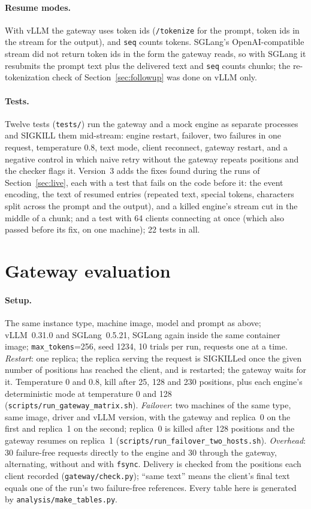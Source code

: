 \documentclass[10pt,twocolumn]{article}
\begin{document}
\paragraph{Resume modes.} With vLLM the gateway uses token ids
(\texttt{/tokenize} for the prompt, token ids in the stream for the output),
and \texttt{seq} counts tokens. SGLang's OpenAI-compatible stream did not
return token ids in the form the gateway reads, so with SGLang it resubmits
the prompt text plus the delivered text and \texttt{seq} counts chunks; the
re-tokenization check of Section~\ref{sec:followup} was done on vLLM only.

\paragraph{Tests.} Twelve tests (\texttt{tests/}) run the gateway and a mock
engine as separate processes and SIGKILL them mid-stream: engine restart,
failover, two failures in one request, temperature 0.8, text mode, client
reconnect, gateway restart, and a negative control in which naive retry
without the gateway repeats positions and the checker flags it. Version~3
adds the fixes found during the runs of Section~\ref{sec:live}, each with a
test that fails on the code before it: the event encoding, the text of
resumed entries (repeated text, special tokens, characters split across the
prompt and the output), and a killed engine's stream cut in the middle of a
chunk; and a test with 64 clients connecting at once (which also passed
before its fix, on one machine); 22 tests in all.

\section{Gateway evaluation}
\label{sec:gweval}

\paragraph{Setup.} The same instance type, machine image, model and prompt as
above; vLLM~0.31.0 and SGLang~0.5.21, SGLang again inside the same container
image; \texttt{max\_tokens}=256, seed 1234, 10 trials per run, requests one at
a time. \emph{Restart}: one replica; the replica serving the request is
SIGKILLed once the given number of positions has reached the client, and is
restarted; the gateway waits for it. Temperature 0 and 0.8, kill after 25,
128 and 230 positions, plus each engine's deterministic mode at temperature
0 and 128 (\texttt{scripts/run\_gateway\_matrix.sh}). \emph{Failover}: two
machines of the same type, same image, driver and vLLM version, with the
gateway and replica~0 on the first and replica~1 on the second; replica~0 is
killed after 128 positions and the gateway resumes on replica~1
(\texttt{scripts/run\_failover\_two\_hosts.sh}). \emph{Overhead}: 30
failure-free requests directly to the engine and 30 through the gateway,
alternating, without and with \texttt{fsync}. Delivery is checked from the
positions each client recorded (\texttt{gateway/check.py}); ``same text''
means the client's final text equals one of the run's two failure-free
references. Every table here is generated by \texttt{analysis/make\_tables.py}.
\end{document}
